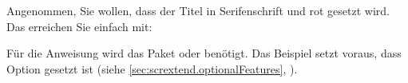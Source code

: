 \else
    \begin{Example}
      Angenommen, Sie wollen, dass der Titel in Serifenschrift und rot gesetzt
      wird. Das erreichen Sie einfach mit:
      \iffalse%
\begin{lstcode}[moretexcs=color]
  \setkomafont{title}{%
    \color{red}%
  }
\end{lstcode}
      \else%
\begin{lstcode}[moretexcs=color]
\end{lstcode}
      \fi%
      Für die Anweisung  wird das Paket
       oder
       benötigt. %
      %
      Das Beispiel setzt voraus, dass
      Option  gesetzt ist
      (siehe \autoref{sec:scrextend.optionalFeatures},
      ).
    \end{Example}
  \else
